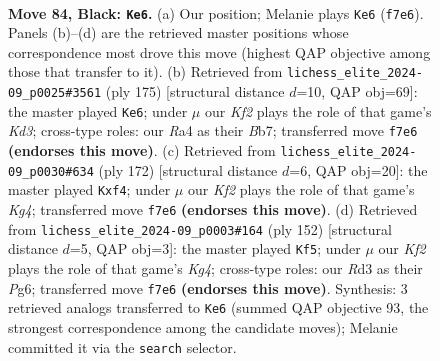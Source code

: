 \documentclass[11pt]{article}
\begin{document}
\clearpage

\begin{figure}[p]\centering
\begin{subfigure}{0.46\textwidth}\centering
\resizebox{\linewidth}{!}{%
\newchessgame
\chessboard[
  setfen={8/1R3k2/8/6K1/r6P/3r4/8/8 b - - 10 84},
  showmover=false,
  pgfstyle=straightmove, color=movearrow, markmove={f7-e6}
]}
\caption{}
\end{subfigure}\hfill
\begin{subfigure}{0.46\textwidth}\centering
\resizebox{\linewidth}{!}{%
\newchessgame
\chessboard[
  setfen={3K4/1bP5/3k4/8/8/8/3R4/8 b - - 26 88},
  showmover=false,
  pgfstyle=straightmove, color=movearrow, markmove={d6-e6}
]}
\caption{}
\end{subfigure}
\\[4pt]
\begin{subfigure}{0.46\textwidth}\centering
\resizebox{\linewidth}{!}{%
\newchessgame
\chessboard[
  setfen={8/8/2R5/8/5rK1/2p5/3k4/8 w - - 0 87},
  showmover=false,
  pgfstyle=straightmove, color=movearrow, markmove={g4-f4}
]}
\caption{}
\end{subfigure}\hfill
\begin{subfigure}{0.46\textwidth}\centering
\resizebox{\linewidth}{!}{%
\newchessgame
\chessboard[
  setfen={8/8/1r4P1/4R3/6K1/8/4p3/5k2 w - - 1 77},
  showmover=false,
  pgfstyle=straightmove, color=movearrow, markmove={g4-f5}
]}
\caption{}
\end{subfigure}
\caption{\textbf{Move 84, Black: \texttt{Ke6}.} (a) Our position; Melanie plays \texttt{Ke6} (\texttt{f7e6}). Panels (b)--(d) are the retrieved master positions whose correspondence most drove this move (highest QAP objective among those that transfer to it). (b) Retrieved from \texttt{lichess\_elite\_2024-09\_p0025\#3561} (ply 175) [structural distance $d$=10, QAP obj=69]: the master played \texttt{Ke6}; under $\mu$ our \emph{Kf2} plays the role of that game's \emph{Kd3}; cross-type roles: our \emph{R}a4 as their \emph{B}b7; transferred move \texttt{f7e6} \textbf{(endorses this move)}. (c) Retrieved from \texttt{lichess\_elite\_2024-09\_p0030\#634} (ply 172) [structural distance $d$=6, QAP obj=20]: the master played \texttt{Kxf4}; under $\mu$ our \emph{Kf2} plays the role of that game's \emph{Kg4}; transferred move \texttt{f7e6} \textbf{(endorses this move)}. (d) Retrieved from \texttt{lichess\_elite\_2024-09\_p0003\#164} (ply 152) [structural distance $d$=5, QAP obj=3]: the master played \texttt{Kf5}; under $\mu$ our \emph{Kf2} plays the role of that game's \emph{Kg4}; cross-type roles: our \emph{R}d3 as their \emph{P}g6; transferred move \texttt{f7e6} \textbf{(endorses this move)}. Synthesis: 3 retrieved analogs transferred to \texttt{Ke6} (summed QAP objective 93, the strongest correspondence among the candidate moves); Melanie committed it via the \texttt{search} selector.}
\label{fig:thought-m167}
\end{figure}
\end{document}
